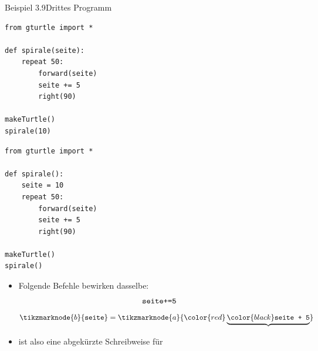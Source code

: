 \begin{frame}[fragile]{Beispiel 3.9}{Drittes Programm}
\begin{minipage}[c]{.49\linewidth}
    \begin{lstlisting}
from gturtle import *

def spirale(seite):
    repeat 50:
        forward(seite)
        seite += 5
        right(90)

makeTurtle()
spirale(10)    
\end{lstlisting}
\end{minipage}\hfill
\begin{minipage}[c]{.49\linewidth}
    \begin{lstlisting}
from gturtle import *

def spirale():
    seite = 10
    repeat 50:
        forward(seite)
        seite += 5
        right(90)

makeTurtle()
spirale()   
\end{lstlisting}
\end{minipage}

\begin{itemize}
    \item<2-> Folgende Befehle bewirken dasselbe:\\
    \scriptsize
\begin{equation}
    \text{\texttt{seite+=5}}
\end{equation}
\begin{equation}
    \tikzmarknode{b}{\text{\texttt{seite}}} =\tikzmarknode{a}{\color{red}\underbrace{\color{black}\text{\texttt{seite + 5}}}}
\end{equation}
\normalsize
    \item<3>  ist also eine abgekürzte Schreibweise für 
    
\end{itemize}
\end{frame}

